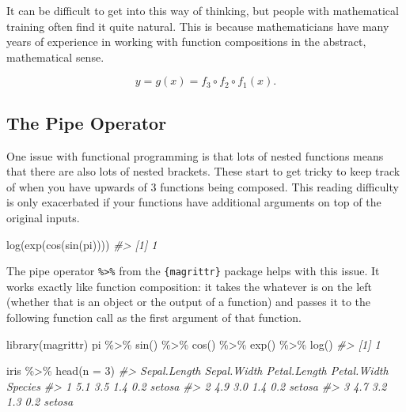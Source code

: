 \documentclass[
  12pt,
]{book}
\newenvironment{Shaded}{\begin{snugshade}}{\end{snugshade}}
\newcommand{\AttributeTok}[1]{\textcolor[rgb]{0.77,0.63,0.00}{#1}}
\newcommand{\CommentTok}[1]{\textcolor[rgb]{0.56,0.35,0.01}{\textit{#1}}}
\newcommand{\DecValTok}[1]{\textcolor[rgb]{0.00,0.00,0.81}{#1}}
\newcommand{\FunctionTok}[1]{\textcolor[rgb]{0.00,0.00,0.00}{#1}}
\newcommand{\NormalTok}[1]{#1}
\newcommand{\SpecialCharTok}[1]{\textcolor[rgb]{0.00,0.00,0.00}{#1}}
\begin{document}
It can be difficult to get into this way of thinking, but people with mathematical training often find it quite natural. This is because mathematicians have many years of experience in working with function compositions in the abstract, mathematical sense.

\[y = g(x) = f_3 \circ f_2 \circ f_1(x).\]

\hypertarget{the-pipe-operator}{%
\subsection{The Pipe Operator}\label{the-pipe-operator}}

One issue with functional programming is that lots of nested functions means that there are also lots of nested brackets. These start to get tricky to keep track of when you have upwards of 3 functions being composed. This reading difficulty is only exacerbated if your functions have additional arguments on top of the original inputs.

\begin{Shaded}
\begin{Highlighting}[]
\FunctionTok{log}\NormalTok{(}\FunctionTok{exp}\NormalTok{(}\FunctionTok{cos}\NormalTok{(}\FunctionTok{sin}\NormalTok{(pi))))}
\CommentTok{\#\textgreater{} [1] 1}
\end{Highlighting}
\end{Shaded}

The pipe operator \texttt{\%\textgreater{}\%} from the \texttt{\{magrittr\}} package helps with this issue. It works exactly like function composition: it takes the whatever is on the left (whether that is an object or the output of a function) and passes it to the following function call as the first argument of that function.

\begin{Shaded}
\begin{Highlighting}[]
\FunctionTok{library}\NormalTok{(magrittr)}
\NormalTok{pi }\SpecialCharTok{\%\textgreater{}\%} 
  \FunctionTok{sin}\NormalTok{() }\SpecialCharTok{\%\textgreater{}\%} 
  \FunctionTok{cos}\NormalTok{() }\SpecialCharTok{\%\textgreater{}\%} 
  \FunctionTok{exp}\NormalTok{() }\SpecialCharTok{\%\textgreater{}\%} 
  \FunctionTok{log}\NormalTok{()}
\CommentTok{\#\textgreater{} [1] 1}
\end{Highlighting}
\end{Shaded}

\begin{Shaded}
\begin{Highlighting}[]
\NormalTok{iris }\SpecialCharTok{\%\textgreater{}\%} 
  \FunctionTok{head}\NormalTok{(}\AttributeTok{n =} \DecValTok{3}\NormalTok{)}
\CommentTok{\#\textgreater{}   Sepal.Length Sepal.Width Petal.Length Petal.Width Species}
\CommentTok{\#\textgreater{} 1          5.1         3.5          1.4         0.2  setosa}
\CommentTok{\#\textgreater{} 2          4.9         3.0          1.4         0.2  setosa}
\CommentTok{\#\textgreater{} 3          4.7         3.2          1.3         0.2  setosa}
\end{Highlighting}
\end{Shaded}
\end{document}
